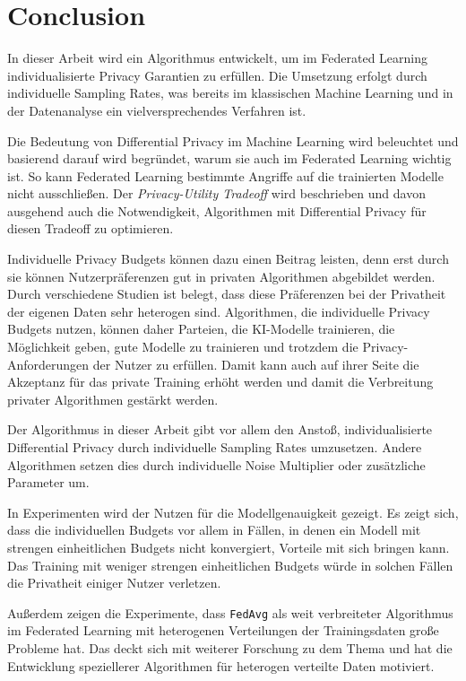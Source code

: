 \chapter{Conclusion}

In dieser Arbeit wird ein Algorithmus entwickelt, um im Federated Learning individualisierte Privacy Garantien zu erfüllen. Die Umsetzung erfolgt durch individuelle Sampling Rates, was bereits im klassischen Machine Learning und in der Datenanalyse ein vielversprechendes Verfahren ist.

Die Bedeutung von Differential Privacy im Machine Learning wird beleuchtet und basierend darauf wird begründet, warum sie auch im Federated Learning wichtig ist. So kann Federated Learning bestimmte Angriffe auf die trainierten Modelle nicht ausschließen. Der \textit{Privacy-Utility Tradeoff} wird beschrieben und davon ausgehend auch die Notwendigkeit, Algorithmen mit Differential Privacy für diesen Tradeoff zu optimieren. 

Individuelle Privacy Budgets können dazu einen Beitrag leisten, denn erst durch sie können Nutzerpräferenzen gut in privaten Algorithmen abgebildet werden. Durch verschiedene Studien ist belegt, dass diese Präferenzen bei der Privatheit der eigenen Daten sehr heterogen sind. Algorithmen, die individuelle Privacy Budgets nutzen, können daher Parteien, die KI-Modelle trainieren, die Möglichkeit geben, gute Modelle zu trainieren und trotzdem die Privacy-Anforderungen der Nutzer zu erfüllen. Damit kann auch auf ihrer Seite die Akzeptanz für das private Training erhöht werden und damit die Verbreitung privater Algorithmen gestärkt werden.

Der Algorithmus in dieser Arbeit gibt vor allem den Anstoß, individualisierte Differential Privacy durch individuelle Sampling Rates umzusetzen. Andere Algorithmen setzen dies durch individuelle Noise Multiplier oder zusätzliche Parameter um.

In Experimenten wird der Nutzen für die Modellgenauigkeit gezeigt. Es zeigt sich, dass die individuellen Budgets vor allem in Fällen, in denen ein Modell mit strengen einheitlichen Budgets nicht konvergiert, Vorteile mit sich bringen kann. Das Training mit weniger strengen einheitlichen Budgets würde in solchen Fällen die Privatheit einiger Nutzer verletzen.

Außerdem zeigen die Experimente, dass \texttt{FedAvg} als weit verbreiteter Algorithmus im Federated Learning mit heterogenen Verteilungen der Trainingsdaten große Probleme hat. Das deckt sich mit weiterer Forschung zu dem Thema und hat die Entwicklung speziellerer Algorithmen für heterogen verteilte Daten motiviert.

